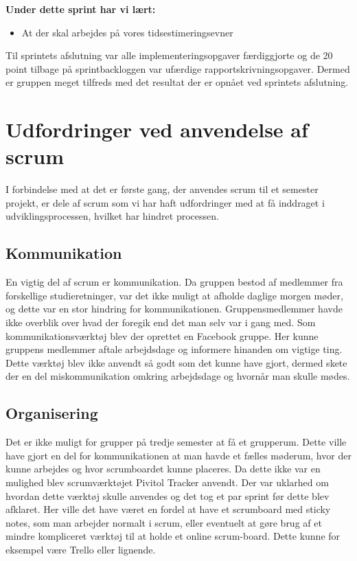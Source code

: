 	\textbf{Under dette sprint har vi lært:}
	\begin{itemize}
		\item At der skal arbejdes på vores tidsestimeringsevner
	\end{itemize}

	Til sprintets afslutning var alle implementeringsopgaver færdiggjorte og de 20 point tilbage på sprintbackloggen var ufærdige rapportskrivningsopgaver. Dermed er gruppen meget tilfreds med det resultat der er opnået ved sprintets afslutning.  


\chapter{Udfordringer ved anvendelse af scrum}
I forbindelse med at det er første gang, der anvendes scrum til et semester projekt, er dele af scrum som vi har haft udfordringer med at få inddraget i udviklingsprocessen, hvilket har hindret processen.

\section{Kommunikation}
En vigtig del af scrum er kommunikation. Da gruppen bestod af medlemmer fra forskellige studieretninger, var det ikke muligt at afholde daglige morgen møder, og dette var en stor hindring for kommunikationen. Gruppensmedlemmer havde ikke overblik over hvad der foregik end det man selv var i gang med. Som kommunikationsværktøj blev der oprettet en Facebook gruppe. Her kunne gruppens medlemmer aftale arbejdsdage og informere hinanden om vigtige ting. Dette værktøj blev ikke anvendt så godt som det kunne have gjort, dermed skete der en del miskommunikation omkring arbejdsdage og hvornår man skulle mødes. \par

\section{Organisering}
Det er ikke muligt for grupper på tredje semester at få et grupperum. Dette ville have gjort en del for kommunikationen at man havde et fælles møderum, hvor der kunne arbejdes og hvor scrumboardet kunne placeres. Da dette ikke var en mulighed blev scrumværktøjet Pivitol Tracker anvendt. Der var uklarhed om hvordan dette værktøj skulle anvendes og det tog et par sprint før dette blev afklaret. Her ville det have været en fordel at have et scrumboard med sticky notes, som man arbejder normalt i scrum, eller eventuelt at gøre brug af et mindre kompliceret værktøj til at holde et online scrum-board. Dette kunne for eksempel være Trello eller lignende. 

